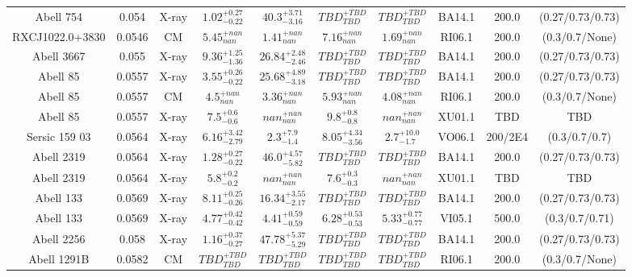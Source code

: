 \begin{table}
\begin{tabular}{cccccccccc}
Abell 754 & 0.054 & X-ray & ${1.02}^{+0.27}_{-0.22}$ & ${40.3}^{+3.71}_{-3.16}$ & ${TBD}^{+TBD}_{TBD}$ & ${TBD}^{+TBD}_{TBD}$ & BA14.1 & 200.0 & (0.27/0.73/0.73) \\
RXCJ1022.0+3830 & 0.0546 & CM & ${5.45}^{+nan}_{nan}$ & ${1.41}^{+nan}_{nan}$ & ${7.16}^{+nan}_{nan}$ & ${1.69}^{+nan}_{nan}$ & RI06.1 & 200.0 & (0.3/0.7/None) \\
Abell 3667 & 0.055 & X-ray & ${9.36}^{+1.25}_{-1.36}$ & ${26.84}^{+2.48}_{-2.46}$ & ${TBD}^{+TBD}_{TBD}$ & ${TBD}^{+TBD}_{TBD}$ & BA14.1 & 200.0 & (0.27/0.73/0.73) \\
Abell 85 & 0.0557 & X-ray & ${3.55}^{+0.26}_{-0.22}$ & ${25.68}^{+4.89}_{-3.18}$ & ${TBD}^{+TBD}_{TBD}$ & ${TBD}^{+TBD}_{TBD}$ & BA14.1 & 200.0 & (0.27/0.73/0.73) \\
Abell 85 & 0.0557 & CM & ${4.5}^{+nan}_{nan}$ & ${3.36}^{+nan}_{nan}$ & ${5.93}^{+nan}_{nan}$ & ${4.08}^{+nan}_{nan}$ & RI06.1 & 200.0 & (0.3/0.7/None) \\
Abell 85 & 0.0557 & X-ray & ${7.5}^{+0.6}_{-0.6}$ & ${nan}^{+nan}_{nan}$ & ${9.8}^{+0.8}_{-0.8}$ & ${nan}^{+nan}_{nan}$ & XU01.1 & TBD & TBD \\
Sersic 159 03 & 0.0564 & X-ray & ${6.16}^{+3.42}_{-2.79}$ & ${2.3}^{+7.9}_{-1.4}$ & ${8.05}^{+4.34}_{-3.56}$ & ${2.7}^{+10.0}_{-1.7}$ & VO06.1 & 200/2E4 & (0.3/0.7/0.7) \\
Abell 2319 & 0.0564 & X-ray & ${1.28}^{+0.27}_{-0.22}$ & ${46.0}^{+4.57}_{-5.82}$ & ${TBD}^{+TBD}_{TBD}$ & ${TBD}^{+TBD}_{TBD}$ & BA14.1 & 200.0 & (0.27/0.73/0.73) \\
Abell 2319 & 0.0564 & X-ray & ${5.8}^{+0.2}_{-0.2}$ & ${nan}^{+nan}_{nan}$ & ${7.6}^{+0.3}_{-0.3}$ & ${nan}^{+nan}_{nan}$ & XU01.1 & TBD & TBD \\
Abell 133 & 0.0569 & X-ray & ${8.11}^{+0.25}_{-0.26}$ & ${16.34}^{+3.55}_{-2.17}$ & ${TBD}^{+TBD}_{TBD}$ & ${TBD}^{+TBD}_{TBD}$ & BA14.1 & 200.0 & (0.27/0.73/0.73) \\
Abell 133 & 0.0569 & X-ray & ${4.77}^{+0.42}_{-0.42}$ & ${4.41}^{+0.59}_{-0.59}$ & ${6.28}^{+0.53}_{-0.53}$ & ${5.33}^{+0.77}_{-0.77}$ & VI05.1 & 500.0 & (0.3/0.7/0.71) \\
Abell 2256 & 0.058 & X-ray & ${1.16}^{+0.37}_{-0.27}$ & ${47.78}^{+5.37}_{-5.29}$ & ${TBD}^{+TBD}_{TBD}$ & ${TBD}^{+TBD}_{TBD}$ & BA14.1 & 200.0 & (0.27/0.73/0.73) \\
Abell 1291B & 0.0582 & CM & ${TBD}^{+TBD}_{TBD}$ & ${TBD}^{+TBD}_{TBD}$ & ${TBD}^{+TBD}_{TBD}$ & ${TBD}^{+TBD}_{TBD}$ & RI06.1 & 200.0 & (0.3/0.7/None) \\

\end{tabular}
\end{table}
